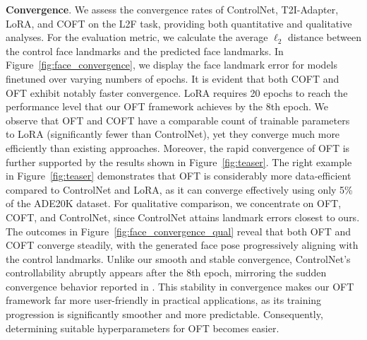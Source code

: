 \textbf{Convergence}. We assess the convergence rates of ControlNet, T2I-Adapter, LoRA, and COFT on the L2F task, providing both quantitative and qualitative analyses. For the evaluation metric, we calculate the average $\ell_2$ distance between the control face landmarks and the predicted face landmarks. In Figure~\ref{fig:face_convergence}, we display the face landmark error for models finetuned over varying numbers of epochs. It is evident that both COFT and OFT exhibit notably faster convergence. LoRA requires 20 epochs to reach the performance level that our OFT framework achieves by the 8th epoch. We observe that OFT and COFT have a comparable count of trainable parameters to LoRA (significantly fewer than ControlNet), yet they converge much more efficiently than existing approaches. Moreover, the rapid convergence of OFT is further supported by the results shown in Figure~\ref{fig:teaser}. The right example in Figure~\ref{fig:teaser} demonstrates that OFT is considerably more data-efficient compared to ControlNet and LoRA, as it can converge effectively using only 5\% of the ADE20K dataset. For qualitative comparison, we concentrate on OFT, COFT, and ControlNet, since ControlNet attains landmark errors closest to ours. The outcomes in Figure~\ref{fig:face_convergence_qual} reveal that both OFT and COFT converge steadily, with the generated face pose progressively aligning with the control landmarks. Unlike our smooth and stable convergence, ControlNet's controllability abruptly appears after the 8th epoch, mirroring the sudden convergence behavior reported in \cite{zhang2023adding}. This stability in convergence makes our OFT framework far more user-friendly in practical applications, as its training progression is significantly smoother and more predictable. Consequently, determining suitable hyperparameters for OFT becomes easier.

